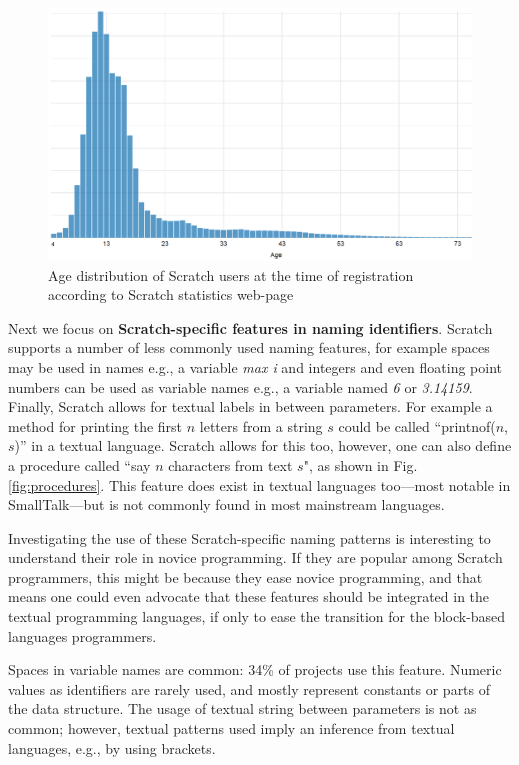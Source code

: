 \documentclass[conference]{IEEEtran}
\begin{document}
\begin{figure}[tb]
	\begin{center}
		\includegraphics[width=0.9\columnwidth]{fig/Scratch_users}
		\caption{Age distribution of Scratch users at the time of registration according to Scratch statistics web-page}
		\label{fig:Scratch_users}
	\end{center}
\end{figure} 
Next we focus on \textbf{Scratch-specific features in naming identifiers}. Scratch supports a number of less commonly used naming features, for example spaces may be used in names e.g., a variable \emph{max i} and integers and even floating point numbers can be used as variable names e.g., a variable named \emph{6} or \emph{3.14159}. Finally, Scratch allows for textual labels in between parameters. For example a method for printing the first $n$ letters from a string $s$ could be called ``printnof($n$,$s$)'' in a textual language. Scratch allows for this too, however, one can also define a procedure called ``say $n$ characters from text $s$", as shown in Fig. \ref{fig:procedures}. 
This feature does exist in textual languages too---most notable in SmallTalk---but is not commonly found in most mainstream languages. 

Investigating the use of these Scratch-specific naming patterns is interesting to understand their role in novice programming. If they are popular among Scratch programmers, this might be because they ease novice programming, and that means one could even advocate that these features should be integrated in the textual programming languages, if only to ease the transition for the block-based languages programmers.

\begin{framed}
 Spaces in variable names are common: 34\% of projects use this feature. 
 Numeric values as identifiers are rarely used, and mostly represent constants or parts of the data structure.
 The usage of textual string between parameters is not as common; however, textual patterns used imply an inference from textual languages, e.g., by using brackets. 
\end{framed}
\end{document}

